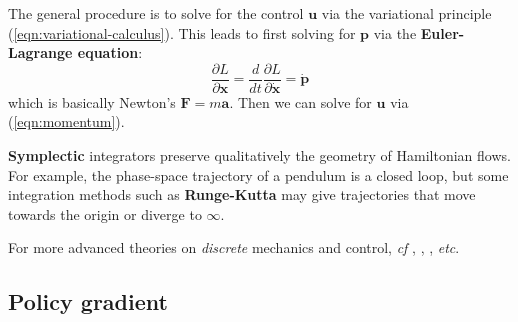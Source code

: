 \documentclass[orivec]{llncs}
\makeatletter
\newcommand{\emp}[1]{\textbf{#1}}
\newcommand{\vect}[1]{\boldsymbol{#1}}
\renewcommand{\boxed}[1]{\fbox{\m@th$\displaystyle\scalebox{0.9}{#1}$} \,}
\makeatother
\begin{document}
The general procedure is to solve for the control $\vect{u}$ via the variational principle (\ref{eqn:variational-calculus}).  This leads to first solving for $\vect{p}$ via the \textbf{Euler-Lagrange equation}:
\begin{equation}
\frac{\partial L}{\partial \vect{x}} = \frac{d}{dt} \frac{\partial L}{\partial \dot{\vect{x}}} = \dot{\vect{p}} 
\end{equation}
which is basically Newton's $\vect{F} = m \vect{a}$.  Then we can solve for $\vect{u}$ via (\ref{eqn:momentum}).

\textbf{Symplectic} integrators preserve qualitatively the geometry of Hamiltonian flows. For example, the phase-space trajectory of a pendulum is a closed loop, but some integration methods such as \textbf{Runge-Kutta} may give trajectories that move towards the origin or diverge to $\infty$.

For more advanced theories on \textit{discrete} mechanics and control, \textit{cf} \cite{Marsden2001}, \cite{Lall2006}, \cite{Stern2008}, \textit{etc}.


\subsection{Policy gradient}
\label{sec:policy-gradient}
\end{document}
